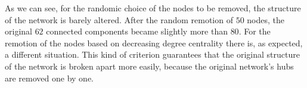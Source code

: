         As we can see, for the randomic choice of the nodes to be removed, the structure of the network is barely
        altered. After the random remotion of $50$ nodes, the original $62$ connected components became slightly
        more than $80$. For the remotion of the nodes based on decreasing degree centrality there is, as expected,
        a different situation. This kind of criterion guarantees that the original structure of the network is
        broken apart more easily, because the original network's hubs are removed one by one.
